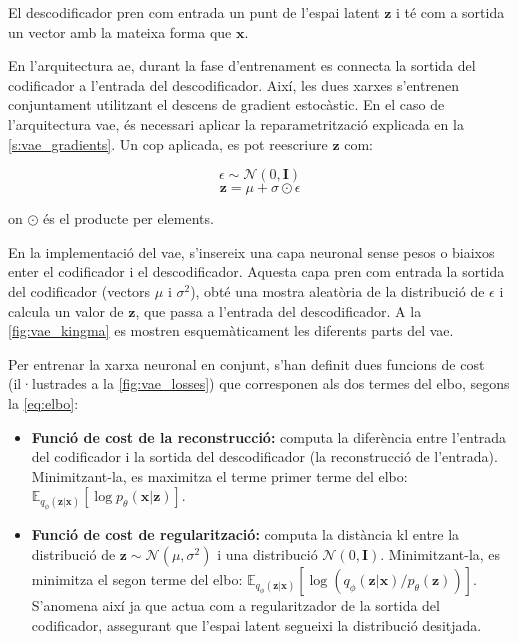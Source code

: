 \documentclass[CAT,BIB]{TFUOC}%
\begin{document}
        El descodificador pren com entrada un punt de l'espai latent $\mathbf{z}$
        i té com a sortida un vector amb la mateixa forma que $\mathbf{x}$.

        En l'arquitectura \gls{ae},
        durant la fase d'entrenament
        es connecta la sortida del codificador a l'entrada del descodificador.
        Així, les dues xarxes s'entrenen conjuntament
        utilitzant el descens de gradient estocàstic.
        En el caso de l'arquitectura \gls{vae},
        és necessari aplicar la reparametrització
        explicada en la \cref{s:vae_gradients}.
        Un cop aplicada, es pot reescriure $\mathbf{z}$ com:

        $$\epsilon \sim \mathcal{N}(0, \mathbf{I})$$
        $$\mathbf{z} = \mu + \sigma \odot \epsilon$$

        on $\odot$ és el producte per elements.

        En la implementació del \gls{vae},
        s'insereix una capa neuronal sense pesos o biaixos
        enter el codificador i el descodificador.
        Aquesta capa pren com entrada la sortida del codificador
        (vectors $\mu$ i $\sigma^2$),
        obté una mostra aleatòria de la distribució de $\epsilon$
        i calcula un valor de $\mathbf{z}$,
        que passa a l'entrada del descodificador.
        A la \cref{fig:vae_kingma} es mostren esquemàticament
        les diferents parts del \gls{vae}.

        Per entrenar la xarxa neuronal en conjunt,
        s'han definit dues funcions de cost
        (il·lustrades a la \cref{fig:vae_losses})
        que corresponen als dos termes del \gls{elbo},
        segons la \cref{eq:elbo}:

        \begin{itemize}
            \item \textbf{Funció de cost de la reconstrucció:}
            computa la diferència entre l'entrada del codificador
            i la sortida del descodificador
            (la reconstrucció de l'entrada).
            Minimitzant-la, es maximitza el terme primer terme del \gls{elbo}:
            $\mathbb{E}_{q_\phi(\mathbf{z|x})} [ \log p_\theta(\mathbf{x|z}) ]$.

            \item \textbf{Funció de cost de regularització:}
            computa la distància \gls{kl}
            entre la distribució de $\mathbf{z} \sim \mathcal{N}(\mu, \sigma^2)$
            i una distribució $\mathcal{N}(0, \mathbf{I})$.
            Minimitzant-la, es minimitza el segon terme del \gls{elbo}:
            $\mathbb{E}_{q_\phi(\mathbf{z|x})} [ \log ( q_\phi(\mathbf{z|x}) / p_\theta(\mathbf{z}) ) ]$.
            S'anomena així ja que actua com a regularitzador
            de la sortida del codificador,
            assegurant que l'espai latent segueixi la distribució desitjada.
        \end{itemize}
\end{document}
